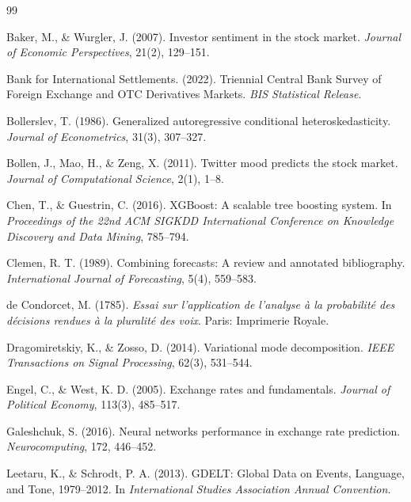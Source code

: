 \documentclass[11pt]{article}
\begin{document}
\begin{thebibliography}{99}

Baker, M., \& Wurgler, J. (2007).
Investor sentiment in the stock market.
\textit{Journal of Economic Perspectives}, 21(2), 129--151.

Bank for International Settlements. (2022).
Triennial Central Bank Survey of Foreign Exchange and OTC Derivatives Markets.
\textit{BIS Statistical Release}.

Bollerslev, T. (1986).
Generalized autoregressive conditional heteroskedasticity.
\textit{Journal of Econometrics}, 31(3), 307--327.

Bollen, J., Mao, H., \& Zeng, X. (2011).
Twitter mood predicts the stock market.
\textit{Journal of Computational Science}, 2(1), 1--8.

Chen, T., \& Guestrin, C. (2016).
XGBoost: A scalable tree boosting system.
In \textit{Proceedings of the 22nd ACM SIGKDD International Conference on Knowledge Discovery and Data Mining}, 785--794.

Clemen, R. T. (1989).
Combining forecasts: A review and annotated bibliography.
\textit{International Journal of Forecasting}, 5(4), 559--583.

de Condorcet, M. (1785).
\textit{Essai sur l'application de l'analyse \`a la probabilit\'e des d\'ecisions rendues \`a la pluralit\'e des voix}.
Paris: Imprimerie Royale.

Dragomiretskiy, K., \& Zosso, D. (2014).
Variational mode decomposition.
\textit{IEEE Transactions on Signal Processing}, 62(3), 531--544.

Engel, C., \& West, K. D. (2005).
Exchange rates and fundamentals.
\textit{Journal of Political Economy}, 113(3), 485--517.

Galeshchuk, S. (2016).
Neural networks performance in exchange rate prediction.
\textit{Neurocomputing}, 172, 446--452.

Leetaru, K., \& Schrodt, P. A. (2013).
GDELT: Global Data on Events, Language, and Tone, 1979--2012.
In \textit{International Studies Association Annual Convention}.


\end{thebibliography}
\end{document}
